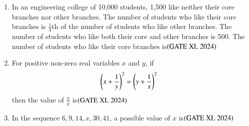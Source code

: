 \documentclass[journal]{IEEEtran}
\begin{document}
\begin{enumerate}
    \item In an engineering college of 10,000 students, 1,500 like neither their core branches nor other branches. The number of students who like their core branches is $\frac{1}{4}$th of the number of students who like other branches. The number of students who like both their core and other branches is 500. The number of students who like their core branches is\hfill $\left(\text{GATE XL 2024}\right)$
    \begin{enumerate}
    \end{enumerate}

    \item For positive non-zero real variables $x$ and $y$, if
    \begin{align}
    \left(x + \frac{1}{y}\right)^2 &= \left(y + \frac{1}{x}\right)^2
    \end{align}
    then the value of $\frac{x}{y}$ is\hfill $\left(\text{GATE XL 2024}\right)$
    \begin{enumerate}
    \end{enumerate}

    \item In the sequence $6, 9, 14, x, 30, 41$, a possible value of $x$ is\hfill $\left(\text{GATE XL 2024}\right)$
    \begin{enumerate}
    \end{enumerate}


\end{enumerate}
\end{document}
